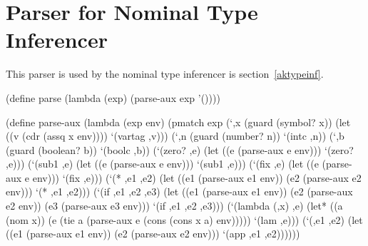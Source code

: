 \chapter{Parser for Nominal Type Inferencer}\label{akinferparser}

This parser is used by the nominal type inferencer is
section~\ref{aktypeinf}.

\schemedisplayspace
\begin{schemedisplay}
(define parse (lambda (exp) (parse-aux exp '())))

(define parse-aux
  (lambda (exp env)
    (pmatch exp
      (`,x (guard (symbol? x))
       (let ((v (cdr (assq x env))))
         `(vartag ,v)))
      (`,n (guard (number? n)) `(intc ,n))
      (`,b (guard (boolean? b)) `(boolc ,b))
      (`(zero? ,e) (let ((e (parse-aux e env))) `(zero? ,e)))
      (`(sub1 ,e) (let ((e (parse-aux e env))) `(sub1 ,e)))
      (`(fix ,e) (let ((e (parse-aux e env))) `(fix ,e)))
      (`(* ,e1 ,e2) (let ((e1 (parse-aux e1 env)) (e2 (parse-aux e2 env))) `(* ,e1 ,e2)))
      (`(if ,e1 ,e2 ,e3)
       (let ((e1 (parse-aux e1 env)) (e2 (parse-aux e2 env)) (e3 (parse-aux e3 env)))
         `(if ,e1 ,e2 ,e3)))
      (`(lambda (,x) ,e)
       (let* ((a (nom x)) (e (tie a (parse-aux e (cons (cons x a) env)))))
         `(lam ,e)))
      (`(,e1 ,e2)
       (let ((e1 (parse-aux e1 env)) (e2 (parse-aux e2 env)))
         `(app ,e1 ,e2))))))
\end{schemedisplay}

